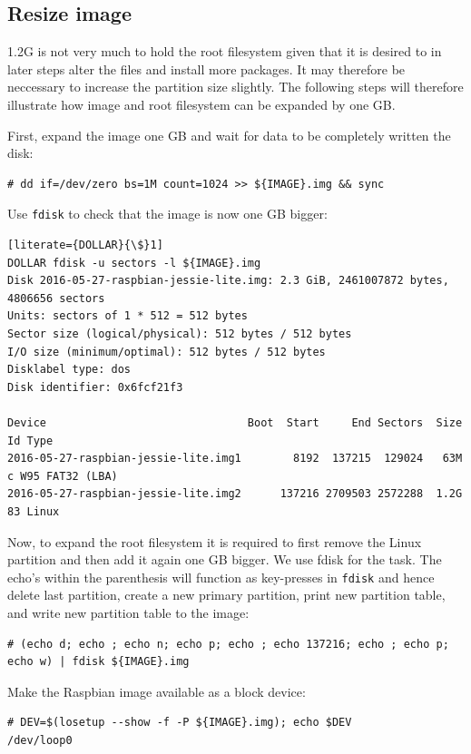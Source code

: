 \subsection{Resize image}
1.2G is not very much to hold the root filesystem given that it is desired to
in later steps alter the files and install more packages. It may therefore be
neccessary to increase the partition size slightly.
The following steps will therefore illustrate how image and root filesystem
can be expanded by one \ac{GB}.

First, expand the image one \ac{GB} and wait for data to be completely written
the disk:
\begin{lstlisting}[]
# dd if=/dev/zero bs=1M count=1024 >> ${IMAGE}.img && sync
\end{lstlisting}
\FloatBarrier
\vspace{-5mm}

Use \texttt{fdisk} to check that the image is now one \ac{GB} bigger:
\begin{lstlisting}[literate={DOLLAR}{\$}1]
DOLLAR fdisk -u sectors -l ${IMAGE}.img
Disk 2016-05-27-raspbian-jessie-lite.img: 2.3 GiB, 2461007872 bytes, 4806656 sectors
Units: sectors of 1 * 512 = 512 bytes
Sector size (logical/physical): 512 bytes / 512 bytes
I/O size (minimum/optimal): 512 bytes / 512 bytes
Disklabel type: dos
Disk identifier: 0x6fcf21f3

Device                               Boot  Start     End Sectors  Size Id Type
2016-05-27-raspbian-jessie-lite.img1        8192  137215  129024   63M  c W95 FAT32 (LBA)
2016-05-27-raspbian-jessie-lite.img2      137216 2709503 2572288  1.2G 83 Linux
\end{lstlisting}
\FloatBarrier
\vspace{-5mm}

Now, to expand the root filesystem it is required to first remove the Linux partition
and then add it again one \ac{GB} bigger.
We use fdisk for the task. The echo's within the parenthesis will function as
key-presses in \texttt{fdisk} and hence delete last partition, create a new
primary partition, print new partition table, and write new partition table
to the image:

\begin{lstlisting}[]
# (echo d; echo ; echo n; echo p; echo ; echo 137216; echo ; echo p; echo w) | fdisk ${IMAGE}.img
\end{lstlisting}
\FloatBarrier
\vspace{-5mm}

Make the Raspbian image available as a block device: 
\begin{lstlisting}[]
# DEV=$(losetup --show -f -P ${IMAGE}.img); echo $DEV
/dev/loop0
\end{lstlisting}
\FloatBarrier
\vspace{-5mm}

